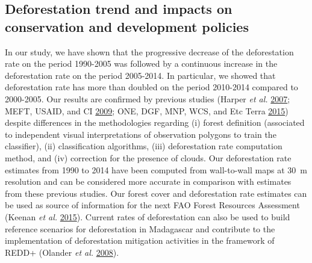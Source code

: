 \documentclass[]{article}
\theoremstyle{definition}
\theoremstyle{definition}
\theoremstyle{definition}
\theoremstyle{remark}
\begin{document}
\hypertarget{deforestation-trend-and-impacts-on-conservation-and-development-policies}{%
\subsection{Deforestation trend and impacts on conservation and
development
policies}\label{deforestation-trend-and-impacts-on-conservation-and-development-policies}}

In our study, we have shown that the progressive decrease of the
deforestation rate on the period 1990-2005 was followed by a continuous
increase in the deforestation rate on the period 2005-2014. In
particular, we showed that deforestation rate has more than doubled on
the period 2010-2014 compared to 2000-2005. Our results are confirmed by
previous studies (Harper \emph{et al.}
\protect\hyperlink{ref-Harper2007}{2007}; MEFT, USAID, and CI
\protect\hyperlink{ref-MEFT2009}{2009}; ONE, DGF, MNP, WCS, and Etc
Terra \protect\hyperlink{ref-ONE2015}{2015}) despite differences in the
methodologies regarding (i) forest definition (associated to independent
visual interpretations of observation polygons to train the classifier),
(ii) classification algorithms, (iii) deforestation rate computation
method, and (iv) correction for the presence of clouds. Our
deforestation rate estimates from 1990 to 2014 have been computed from
wall-to-wall maps at 30~m resolution and can be considered more accurate
in comparison with estimates from these previous studies. Our forest
cover and deforestation rate estimates can be used as source of
information for the next FAO Forest Resources Assessment (Keenan
\emph{et al.} \protect\hyperlink{ref-Keenan2015}{2015}). Current rates
of deforestation can also be used to build reference scenarios for
deforestation in Madagascar and contribute to the implementation of
deforestation mitigation activities in the framework of REDD+ (Olander
\emph{et al.} \protect\hyperlink{ref-Olander2008}{2008}).
\end{document}
